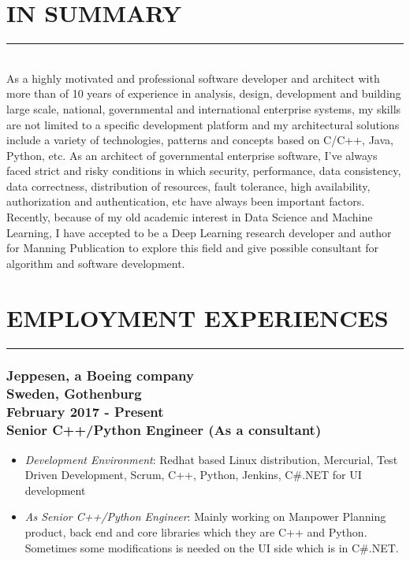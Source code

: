\documentclass[10pt,a4paper]{article}
\begin{document}
\thispagestyle{fancy}

\hfill \break
\section{IN SUMMARY}
\noindent \rule {3.5cm}{0.4pt} \\
As a highly motivated and professional software developer and architect with more than of 10 years of experience in analysis, design, development and building large scale, national, governmental and international enterprise systems, my skills are not limited to a specific development platform and my architectural solutions include a variety of technologies, patterns  and concepts based on C/C++, Java, Python, etc. As an architect of governmental enterprise software, I've always faced strict and risky conditions in which security, performance, data consistency, data correctness, distribution of resources, fault tolerance, high availability, authorization and authentication, etc have always been important factors. Recently, because of my old academic interest in Data Science and Machine Learning, I have accepted to be a Deep Learning research developer and author for Manning Publication to explore this field and give possible consultant for algorithm and software development.

\section{EMPLOYMENT EXPERIENCES}
\noindent \rule {7.3cm}{0.4pt}

\subsubsection{{\large Jeppesen, a Boeing company} \\ \textnormal{Sweden, Gothenburg} \\ \textnormal{February 2017 - Present} \\ {Senior C++/Python Engineer (As a consultant)}}
  \setlength{\leftskip}{0.5cm}
  \setlength{\rightskip}{1cm}
  \begin{itemize}
    \setlength{\rightskip}{1cm}
    \setlength\itemsep{0em}
    \item \small \textit {Development Environment}: Redhat based Linux distribution, Mercurial, Test Driven Development, Scrum, C++, Python, Jenkins, C\#.NET for UI development
    \item \small \textit {As Senior C++/Python Engineer}: Mainly working on Manpower Planning product, back end and core libraries which they are C++ and Python. Sometimes some modifications is needed on the UI side which is in C\#.NET.
  \end{itemize}
  \setlength{\leftskip}{0pt}
  \setlength{\rightskip}{0cm}
  
\end{document}
